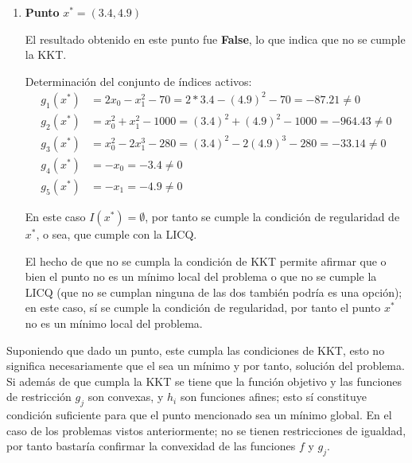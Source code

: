 \documentclass[titlepage, 11pt]{scrartcl}
\begin{document}
\begin{enumerate}
\begin{enumerate}
\begin{enumerate}
		En este caso $I(x^*)  = \emptyset$, por tanto se cumple la condici\'on de regularidad de $x^*$, o sea, que cumple con la LICQ.
		
		El hecho de que no se cumpla la condición de KKT permite afirmar que o bien el punto no es un m\'inimo local del problema o que no se cumple la LICQ (que no se cumplan ninguna de las dos también podría es una opci\'on); en este caso, s\'i se cumple la condici\'on de regularidad, por tanto el punto $x^*$ no es un m\'inimo local del problema.
		
		\vspace{7mm}
		\item \textbf{Punto} $x^* = (3.4, 4.9)$
		
		El resultado obtenido en este punto fue \textbf{False}, lo que indica que no se cumple la KKT.
		
		Determinaci\'on del conjunto de \'indices activos:
		\begin{align*}
		g_1(x^*) &= 2x_0 - x_1^2 - 70 = 2 * 3.4 - (4.9)^2 - 70 = -87.21\neq 0\\
		g_2(x^*) &= x_0^2 + x_1^2- 1000 = (3.4)^2 + (4.9)^2 -1000 = -964.43 \neq 0\\
		g_3(x^*) &= x_0^2 - 2 x_1^3 - 280 = (3.4)^2 - 2(4.9)^3 - 280 = -33.14 \neq 0\\
		g_4(x^*) &= -x_0 = -3.4\neq 0\\
		g_5(x^*) &= -x_1 = -4.9\neq 0
		\end{align*}
		
		En este caso $I(x^*)  = \emptyset$, por tanto se cumple la condici\'on de regularidad de $x^*$, o sea, que cumple con la LICQ.
		
		El hecho de que no se cumpla la condición de KKT permite afirmar que o bien el punto no es un m\'inimo local del problema o que no se cumple la LICQ (que no se cumplan ninguna de las dos también podría es una opci\'on); en este caso, s\'i se cumple la condici\'on de regularidad, por tanto el punto $x^*$ no es un m\'inimo local del problema.
		\end{enumerate}

		
	\end{enumerate}
\end{enumerate}

\vspace{1cm}
Suponiendo que dado un punto, este cumpla las condiciones de KKT, esto no significa necesariamente que el sea un mínimo y por tanto, soluci\'on del problema. Si adem\'as de que cumpla la KKT se tiene que la funci\'on objetivo y las funciones de restricci\'on $g_j$ son convexas, y $h_i$ son funciones afines; esto s\'i constituye condici\'on suficiente para que el punto mencionado sea un m\'inimo global. En el caso de los problemas vistos anteriormente; no se tienen restricciones de igualdad, por tanto bastar\'ia confirmar la convexidad de las funciones $f$ y $g_j$.
\end{document}
